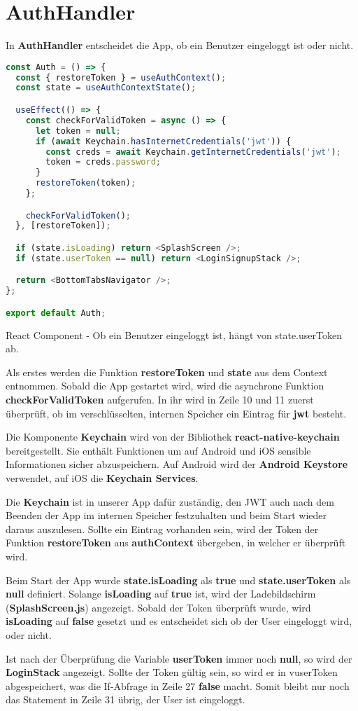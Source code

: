 \section{AuthHandler}
In \textbf{AuthHandler} entscheidet die App, ob ein Benutzer eingeloggt ist oder nicht.

\begin{code}[htp]
\begin{lstlisting}[firstnumber=1,language=JavaScript, style=JSX]
const Auth = () => {
  const { restoreToken } = useAuthContext();
  const state = useAuthContextState();

  useEffect(() => {
    const checkForValidToken = async () => {
      let token = null;
      if (await Keychain.hasInternetCredentials('jwt')) {
        const creds = await Keychain.getInternetCredentials('jwt');
        token = creds.password;
      }
      restoreToken(token);
    };

    checkForValidToken();
  }, [restoreToken]);

  if (state.isLoading) return <SplashScreen />;
  if (state.userToken == null) return <LoginSignupStack />;

  return <BottomTabsNavigator />;
};

export default Auth;
\end{lstlisting}
\caption{React Component - Ob ein Benutzer eingeloggt ist, hängt von state.userToken ab.}
\end{code}

Als erstes werden die Funktion \textbf{restoreToken} und \textbf{state} aus dem Context entnommen.
Sobald die App gestartet wird, wird die asynchrone Funktion \textbf{checkForValidToken} aufgerufen.
In ihr wird in Zeile 10 und 11 zuerst überprüft, ob im verschlüsselten, internen Speicher ein
Eintrag für \textbf{jwt} besteht.

Die Komponente \textbf{Keychain} wird von der Bibliothek \textbf{react-native-keychain}
bereitgestellt. Sie enthält Funktionen um auf Android und iOS sensible Informationen sicher
abzuspeichern. Auf Android wird der \textbf{Android Keystore} verwendet, auf iOS die
\textbf{Keychain Services}.

Die \textbf{Keychain} ist in unserer App dafür zuständig, den JWT auch nach dem Beenden der App im
internen Speicher festzuhalten und beim Start wieder daraus auszulesen. Sollte ein Eintrag vorhanden
sein, wird der Token der Funktion \textbf{restoreToken} aus \textbf{authContext} übergeben, in
welcher er überprüft wird.

\newpage
Beim Start der App wurde \textbf{state.isLoading} als \textbf{true} und \textbf{state.userToken} als
\textbf{null} definiert. Solange \textbf{isLoading} auf \textbf{true} ist, wird der Ladebildschirm
(\textbf{SplashScreen.js}) angezeigt. Sobald der Token überprüft wurde, wird \textbf{isLoading} auf
\textbf{false} gesetzt und es entscheidet sich ob der User eingeloggt wird, oder nicht.

Ist nach der Überprüfung die Variable \textbf{userToken} immer noch \textbf{null}, so wird der
\textbf{LoginStack} angezeigt. Sollte der Token gültig sein, so wird er in v{userToken}
abgespeichert, was die If-Abfrage in Zeile 27 \textbf{false} macht. Somit bleibt nur noch das
Statement in Zeile 31 übrig, der User ist eingeloggt.
